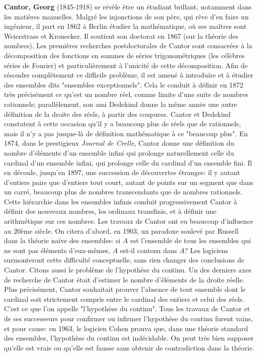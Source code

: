 \textbf{Cantor, Georg} (1845-1918) se révèle être un étudiant brillant, notamment dans les matières manuelles. Malgré les injonctions de son père, qui rêve d'en faire un ingénieur, il part en 1862 à Berlin étudier la mathématique, où ses maîtres sont Weierstrass et Kronecker. Il soutient son doctorat en 1867 (sur la théorie des nombres). Les premières recherches postdoctorales de Cantor sont consacrées à la décomposition des fonctions en sommes de séries trigonométriques (les célèbres séries de Fourier) et particulièrement à l'unicité de cette décomposition. Afin de résoudre complètement ce difficile problème, il est amené à introduire et à étudier des ensembles dits "ensembles exceptionnels". Cela le conduit à définir en 1872 très précisément ce qu'est un nombre réel, comme limite d'une suite de nombres rationnels; parallèlement, son ami Dedekind donne la même année une autre définition de la droite des réels, à partir des coupures. Cantor et Dedekind constatent à cette occasion qu'il y a beaucoup plus de réels que de rationnels, mais il n'y a pas jusque-là de définition mathématique à ce "beaucoup plus". En 1874, dans le prestigieux \textit{Journal de Crelle}, Cantor donne une définition du nombre d'éléments d'un ensemble infini qui prolonge naturellement celle du cardinal d'un ensemble infini, qui prolonge celle du cardinal d'un ensemble fini. Il en découle, jusqu'en 1897, une succession de découvertes étranges: il y autant d'entiers pairs que d'entiers tout court, autant de points sur un segment que dans un carré, beaucoup plus de nombres transcendants que de nombres rationnels. Cette hiérarchie dans les ensembles infinis conduit progressivement Cantor à définir des nouveaux nombres, les ordinaux transfinis, et à définir une arithmétique sur ces nombres. Les travaux de Cantor ont eu beaucoup d'influence au 20ème siècle. On citera d'abord, en 1903, un paradoxe soulevé par Russell dans la théorie naïve des ensembles: si $A$ est l'ensemble de tous les ensembles qui ne sont pas éléments d'eux-mêmes, $A$ est-il contenu dans $A$? Les logiciens surmonteront cette difficulté conceptuelle, sans rien changer des conclusions de Cantor. Citons aussi le problème de l'hypothèse du continu. Un des derniers axes de recherche de Cantor était d'estimer le nombre d'éléments de la droite réelle. Plus précisément, Cantor souhaitait prouver l'absence de tout ensemble dont le cardinal soit strictement compris entre le cardinal des entiers et celui des réels. C'est ce que l'on appelle "l'hypothèse du continu". Tous les travaux de Cantor et de ses successeurs pour confirmer ou infirmer l'hypothèse du continu furent vains, et pour cause: en 1963, le logicien Cohen prouva que, dans une théorie standard des ensembles, l'hypothèse du continu est indécidable. On peut très bien supposer qu'elle est vraie ou qu'elle est fausse sans obtenir de contradiction dans la théorie.


